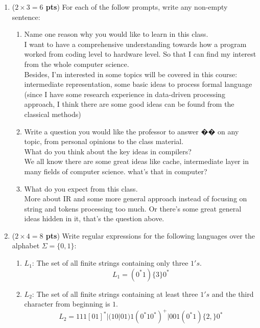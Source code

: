 \documentclass[10pt]{article}
\newcommand {\pts}[1]{({\bf #1 pts})}
\begin{document}
\begin{enumerate}
  \item \pts{$2\times 3=6$} For each of the follow prompts, write any non-empty sentence:
  \begin{enumerate}
           \item Name one reason why you would like to learn in this class.
           \\
            I want to have a comprehensive understanding towards how a program
            worked from coding level to hardware level. So that I can find my
            interest from the whole computer science. \\
            Besides, I'm interested in some topics will be covered
            in this course: intermediate representation, some basic ideas to
            process formal language (since I have some research experience in
            data-driven processing approach, I think there are some good ideas
            can be found from the classical methods)
           \item Write a question you would like the professor to answer �� on any topic, from personal opinions to the class material.
            \\
            What do you think about the key ideas in compilers?\\
            We all know there are some great ideas like cache, intermediate layer in many fields of computer science.
            what's that in computer?
           \item What do you expect from this class.
           \\
           More about IR and some more general approach instead of focusing on
           string and tokens processing too much. Or there's some great general
           ideas hidden in it, that's the question above.
  \end{enumerate}
  \item \pts{$2\times 4=8$} Write regular expressions for the following languages over the alphabet $\Sigma=\{0,1\}$:
 \begin{enumerate}
           \item $L_1$: The set of all finite strings containing only three $1's$.
            \[
            L_1 = (0^*1)\{3\}0^*
            \]
           \item $L_2$: The set of all finite strings containing at least three $1's$ and the third character from beginning is $1$.
            \[
            L_2 = 111[01]^*|(10|01)1(0^*10^*)^+|001(0^*1)\{2,\}0^*
\]
\end{enumerate}
\end{enumerate}
\end{document}
